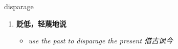 
\begin{frame}
{\huge disparage}
\begin{center}
\begin{enumerate}\Large
  \item \textbf{贬低，轻蔑地说}
  \begin{itemize}
    \item \em{\Large{use the past to disparage the present 借古讽今}}
  \end{itemize}
\end{enumerate}
\end{center}
\end{frame}
